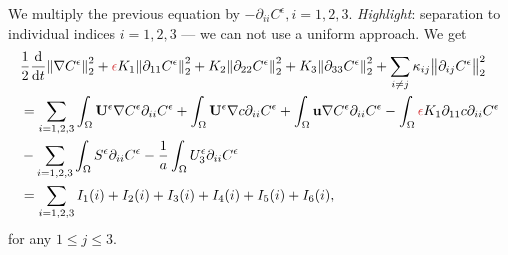 \documentclass{beamer}
\newcommand*\diff{\mathop{}\!\mathrm{d}}
\begin{document}
\begin{frame}
\changefontsizes{10pt}
We multiply the previous equation by $- \partial_{ii} C^\epsilon, i=1,2,3.$ \textit{Highlight}: separation to individual indices $i = 1,2,3$ --- we can not use a uniform approach. We get
%
\begin{equation} \nonumber
  \begin{split}
      & \frac{1}{2}\frac{\diff}{\diff t} \norm{\nabla C^\epsilon}_2^2 + \textcolor{jasper}{\epsilon} K_1 \norm{\partial_{11} C^\epsilon}_2^2 + K_2 \norm{\partial_{22} C^\epsilon}_2^2 + K_3 \norm{\partial_{33} C^\epsilon}_2^2 + \sum_{i \neq j} \kappa_{ij} \norm{\partial_{ij} C^\epsilon}_2^2 \\
      & = \sum_{i = 1,2,3} \int_\Omega \mathbf{U}^\epsilon \nabla C^\epsilon \partial_{ii} C^\epsilon + \int_\Omega \mathbf{U}^\epsilon \nabla c \partial_{ii} C^\epsilon + \int_\Omega \mathbf{u} \nabla C^\epsilon \partial_{ii} C^\epsilon - \int_\Omega \textcolor{jasper}{\epsilon} K_1 \partial_{11} c \partial_{ii} C^\epsilon \\
      & - \sum_{i = 1,2,3} \int_\Omega S^\epsilon \partial_{ii} C^\epsilon - \frac{1}{a} \int_\Omega U_3^\epsilon \partial_{ii} C^\epsilon \\
      & = \sum_{i = 1,2,3} I_1(i)  + I_2(i) + I_3(i) + I_4(i) + I_5(i) + I_6(i),
  \end{split}
\end{equation}
%
for any $1 \leq j \leq 3.$

\end{frame}
\end{document}
